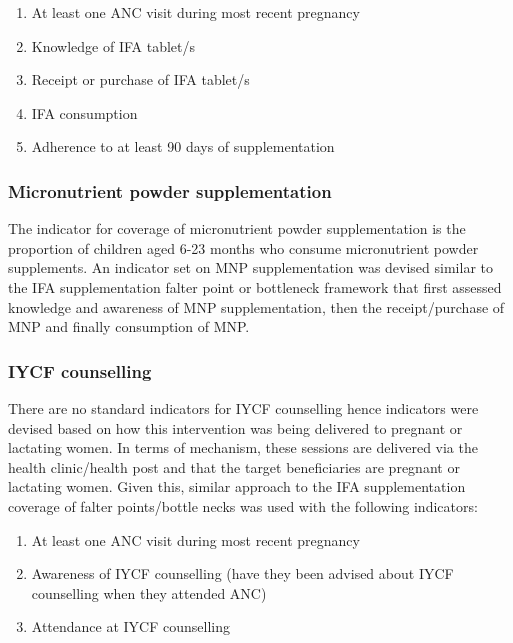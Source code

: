 \documentclass[12pt,a4paper]{article}
\theoremstyle{definition}
\theoremstyle{definition}
\theoremstyle{definition}
\theoremstyle{remark}
\begin{document}
\begin{enumerate}
\def\labelenumi{\arabic{enumi}.}
\item
  At least one ANC visit during most recent pregnancy
\item
  Knowledge of IFA tablet/s
\item
  Receipt or purchase of IFA tablet/s
\item
  IFA consumption
\item
  Adherence to at least 90 days of supplementation
\end{enumerate}

\hypertarget{micronutrient-powder-supplementation}{%
\subsubsection{Micronutrient powder
supplementation}\label{micronutrient-powder-supplementation}}

The indicator for coverage of micronutrient powder supplementation is
the proportion of children aged 6-23 months who consume micronutrient
powder supplements. An indicator set on MNP supplementation was devised
similar to the IFA supplementation falter point or bottleneck framework
that first assessed knowledge and awareness of MNP supplementation, then
the receipt/purchase of MNP and finally consumption of MNP.

\hypertarget{iycf-counselling}{%
\subsubsection{IYCF counselling}\label{iycf-counselling}}

There are no standard indicators for IYCF counselling hence indicators
were devised based on how this intervention was being delivered to
pregnant or lactating women. In terms of mechanism, these sessions are
delivered via the health clinic/health post and that the target
beneficiaries are pregnant or lactating women. Given this, similar
approach to the IFA supplementation coverage of falter points/bottle
necks was used with the following indicators:

\begin{enumerate}
\def\labelenumi{\arabic{enumi}.}
\item
  At least one ANC visit during most recent pregnancy
\item
  Awareness of IYCF counselling (have they been advised about IYCF
  counselling when they attended ANC)
\item
  Attendance at IYCF counselling
\end{enumerate}
\end{document}
